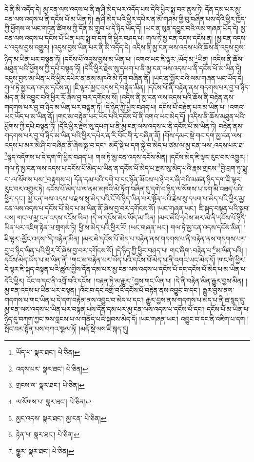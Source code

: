 དེ་ནི་མི་འདོད་དེ། མྱ་ངན་ལས་འདས་པ་ནི་རྒ་ཤི་མེད་པར་འདོད་པས་དེའི་ཕྱིར་སྨྲ་བར་ནུས་ཏེ། དོན་དམ་པར་མྱ་ངན་ལས་འདས་པ་ནི་དངོས་པོ་མ་ཡིན་ཏེ། རྒ་ཤི་མེད་པའི་ཕྱིར་དཔེར་ན་མོ་གཤམ་གྱི་བུ་བཞིན་པས་དེའི་ཕྱིར་ཁྱོད་ཀྱི་ཕྱོགས་ལ་ཡང་གཏན་ཚིགས་ཀྱི་དོན་མ་གྲུབ་པ་དེ་ཉིད་ཡོད་དོ། །ཡང་ན་སུན་དབྱུང་བའི་ལམ་གཞན་ཡོད་དེ། མྱ་ངན་ལས་འདས་པ་དངོས་པོ་ཡིན་པར་སྨྲ་བ་དག་གི་ཕྱིར་བཤད་པ། གལ་ཏེ་མྱ་ངན་འདས་དངོས་ན། །མྱ་ངན་འདས་པ་འདུས་བྱས་འགྱུར། །འདུས་བྱས་ཡིན་པར་ནི་མི་འདོད་དེ། འདིས་ནི་མྱ་ངན་ལས་འདས་པའི་ཆོས་ནི་འདུས་བྱས་ཉིད་མ་ཡིན་པར་བསྟན་ཏོ། །དངོས་པོ་འདུས་བྱས་མ་ཡིན་པ། །འགའ་ཡང་ཇི་ལྟར་:ཡོད་མ་\footnote{ཡོད་པ་  སྣར་ཐང་།  པེ་ཅིན། }ཡིན། །འདིས་ནི་ཆོས་མཐུན་པའི་ཕྱོགས་ཀྱི་དཔེ་བསྟན་ཏོ། །དེའི་ཕྱིར་རྗེས་སུ་དཔག་པ་ནི་མྱ་ངན་ལས་འདས་པ་ནི་དངོས་པོ་མ་ཡིན་ཏེ། འདུས་བྱས་མ་ཡིན་པའི་ཕྱིར་དཔེར་ན་ནམ་མཁའི་མེ་ཏོག་བཞིན་ནོ། །ཡང་ན་སྦྱོར་བའི་ལམ་གཞན་ཡང་ཡོད་དེ། གལ་ཏེ་མྱ་ངན་འདས་དངོས་ན། །ཇི་ལྟར་མྱང་འདས་དེ་བརྟེན་མིན། །དངོས་པོ་ནི་བརྟེན་ནས་གདགས་པར་བྱ་བ་ཉིད་མེད་ན་མི་འབྱུང་བའི་ཕྱིར་རོ་ཞེས་བྱ་བར་དགོངས་སོ། །འདིས་ནི་མྱ་ངན་ལས་འདས་པའི་ཆོས་ནི་བརྟེན་ནས་གདགས་པར་བྱ་བ་ཉིད་མ་ཡིན་པར་བསྟན་ཏོ། །དེ་ཉིད་ཀྱི་ཕྱིར་བཤད་པ། དངོས་པོ་བརྟེན་པར་མ་ཡིན་པ། །འགའ་ཡང་ཡོད་པ་མ་ཡིན་ནོ། །གང་མ་བརྟེན་པར་ཡོད་པའི་དངོས་པོ་ནི་འགའ་ཡང་མེད་དོ། །འདིས་ནི་ཆོས་མཐུན་པའི་ཕྱོགས་ཀྱི་དཔེ་བསྟན་ཏོ། །དེའི་ཕྱིར་རྗེས་སུ་དཔག་པ་ནི་མྱ་ངན་ལས་འདས་པ་ནི་དངོས་པོ་མ་ཡིན་ཏེ། བརྟེན་ནས་གདགས་པར་བྱ་བ་ཉིད་མ་ཡིན་པའི་ཕྱིར་དཔེར་ན་རི་བོང་གི་རྭ་བཞིན་ནོ། །གོས་དམར་སྡེ་གང་དག་མྱ་ངན་ལས་འདས་པ་མར་མེ་ཤི་བ་བཞིན་ནོ་ཞེས་སྨྲ་བ་དང་། མདོ་སྡེ་པ་དག་སྐྱེ་བ་མེད་པ་ཙམ་ལ་མྱ་ངན་ལས་:འདས་པར་ཐ་\footnote{འདས་པར་  སྣར་ཐང་།  པེ་ཅིན། }སྙད་འདོགས་པ་དེ་དག་གི་ཕྱིར་བཤད་པ། གལ་ཏེ་མྱ་ངན་འདས་དངོས་མིན། །དངོས་མེད་ཇི་ལྟར་རུང་བར་འགྱུར། །གལ་ཏེ་མྱ་ངན་ལས་འདས་པ་དངོས་པོ་མེད་པ་ཡིན་ན་དངོས་པོ་མེད་པ་རྫས་སུ་མེད་པའི་རྣམ་གྲངས་\footnote{གྲངས་ལ་  སྣར་ཐང་།  པེ་ཅིན། }བྱེ་བྲག་ཏུ་སྨྲ་བ་:ལ་སོགས་པས་\footnote{ལ་སོགས་པ་  སྣར་ཐང་།  པེ་ཅིན། }བརྟགས་པ། དོན་དམ་པའི་དགེ་བ་དང་ཉོན་མོངས་པ་ཉེ་བར་ཞི་བའི་མཚན་ཉིད་དག་ཇི་ལྟར་རུང་བར་འགྱུར་ཏེ། དངོས་པོ་མེད་པ་ལ་ནམ་མཁའི་མེ་ཏོག་བཞིན་དུ་དགེ་བ་ཉིད་ལ་སོགས་པ་དག་མི་འཐད་པའི་ཕྱིར་དང་། མྱ་ངན་ལས་འདས་པ་རྫས་སུ་མེད་པའི་ངོ་བོ་ཉིད་ཡིན་པར་སྟོན་པའི་རྗེས་སུ་དཔག་པ་མེད་པའི་ཕྱིར་མྱ་ངན་ལས་འདས་པ་དངོས་པོ་མེད་པ་མ་ཡིན་ནོ་ཞེས་བྱ་བར་དགོངས་སོ། །ཡང་གཞན་ཡང་། ཇི་སྐད་བསྟན་པའི་སྒྲུབ་པས། གང་ལ་མྱ་ངན་འདས་དངོས་ཡིན། །དེ་ལ་དངོས་མེད་ཡོད་མ་ཡིན། །མར་མེའི་དཔེས་མར་མེ་ནི་དངོས་པོ་ཉིད་ཡིན་པར་འཇིག་རྟེན་ལ་གྲགས་ཏེ། ཕྱི་ས་མེད་པའི་ཕྱིར་རོ། །ཡང་གཞན་ཡང་། གལ་ཏེ་མྱ་ངན་འདས་དངོས་མིན། །ཇི་ལྟར་:མྱོང་འདས་\footnote{མྱང་འདས་  སྣར་ཐང་། མྱ་ངན་  པེ་ཅིན། }དེ་བརྟེན་མིན། །མར་མེ་དངོས་པོ་མེད་པ་བརྟེན་ནས་གདགས་པ་ནི་བརྟེན་ནས་གདགས་པར་བྱ་བ་ཉིད་ཡིན་པའི་ཕྱིར་རོ་ཞེས་བྱ་བར་དགོངས་སོ། །དེ་ཉིད་ཀྱི་ཕྱིར་བཤད་པ། གང་ཞིག་:བརྟེན་པ་\footnote{རྟེན་པ་  སྣར་ཐང་།  པེ་ཅིན། }མ་ཡིན་པའི། །དངོས་མེད་ཡོད་པ་མ་ཡིན་ནོ། །གང་མ་བརྟེན་པར་ཡོད་པའི་དངོས་པོ་མེད་པ་ནི་འགའ་ཡང་མེད་དོ། །གང་གི་ཕྱིར་དེ་ལྟར་ཇི་སྐད་བསྟན་པའི་ཚུལ་གྱིས་དོན་དམ་པར་མྱ་ངན་ལས་འདས་པ་དངོས་པོ་དང་དངོས་པོ་མེད་པ་མ་ཡིན་པ་དེའི་ཕྱིར། འོང་བ་དང་ནི་འགྲོ་བའི་དངོས། །བརྟན་ཏེ་མ་རྒྱུར་\footnote{སྒྱུར་  སྣར་ཐང་།  པེ་ཅིན། }བྱས་གང་ཡིན་པ། །དེ་ནི་བརྟེན་མིན་རྒྱུར་བྱས་མིན། །མྱ་ངན་འདས་པ་ཡིན་པར་བསྟན། །འོང་བ་དང་འགྲོ་བའི་དངོས་པོ་བརྟེན་ནས་འབྱུང་བ་དང་། རྒྱུར་བྱས་ནས་གདགས་པ་གང་ཡིན་པ་དེ་དག་བརྟེན་ནས་འབྱུང་བ་མེད་པ་དང་། རྒྱུར་བྱས་ནས་གདགས་པ་མེད་པ་ནི་ཐ་སྙད་དུ་མྱ་ངན་ལས་འདས་པ་ཡིན་པར་བསྟན་པས་དོན་དམ་པར་མྱ་ངན་ལས་འདས་པ་དངོས་པོ་དང་། དངོས་པོ་མ་ཡིན་པ་ཉིད་དུ་བཀག་ཀྱང་ཁས་བླངས་པ་ལ་གནོད་པའི་སྐབས་མེད་དོ། །ཡང་གཞན་ཡང་། འབྱུང་བ་དང་ནི་འཇིག་པ་དག །སྤོང་བར་སྟོན་པས་བཀའ་སྩལ་ཏོ། །མདོ་སྡེ་ལས་ཇི་སྐད་དུ། 